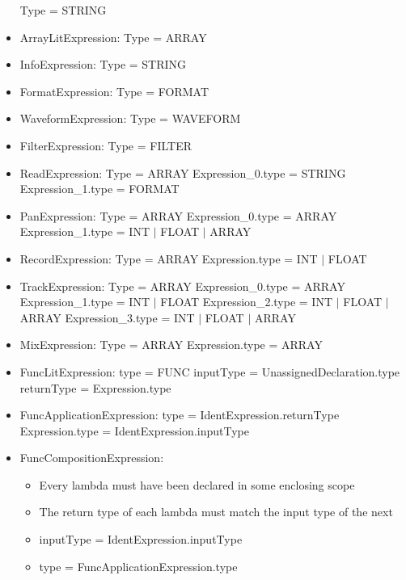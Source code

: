 \begin{itemize}
		\subitem Type = STRING
	\item ArrayLitExpression:
		\subitem Type = ARRAY
	\item InfoExpression:
		\subitem Type = STRING
	\item FormatExpression:
		\subitem Type = FORMAT
	\item WaveformExpression:
		\subitem Type = WAVEFORM
	\item FilterExpression:
		\subitem Type = FILTER
	\item ReadExpression:
		\subitem Type = ARRAY
		\subitem Expression_0.type = STRING
		\subitem Expression_1.type = FORMAT
	\item PanExpression:
		\subitem Type = ARRAY
		\subitem Expression_0.type = ARRAY
		\subitem Expression_1.type = INT $|$ FLOAT $|$ ARRAY
	\item RecordExpression:
		\subitem Type = ARRAY
		\subitem Expression.type = INT $|$ FLOAT
	\item TrackExpression:
		\subitem Type = ARRAY
		\subitem Expression_0.type = ARRAY
		\subitem Expression_1.type = INT $|$ FLOAT
		\subitem Expression_2.type = INT $|$ FLOAT $|$ ARRAY
		\subitem Expression_3.type = INT $|$ FLOAT $|$ ARRAY
	\item MixExpression:
		\subitem Type = ARRAY
		\subitem Expression.type = ARRAY
	\item FuncLitExpression:
		\subitem type = FUNC
		\subitem inputType = UnassignedDeclaration.type
		\subitem returnType = Expression.type
	\item FuncApplicationExpression:
		\subitem type = IdentExpression.returnType
		\subitem Expression.type = IdentExpression.inputType
	\item FuncCompositionExpression:
	\begin{itemize}
		\item Every lambda must have been declared in some enclosing scope
		\item The return type of each lambda must match the input type of the next 
		\item inputType = IdentExpression.inputType
		\item type = FuncApplicationExpression.type
	\end{itemize}
\end{itemize}